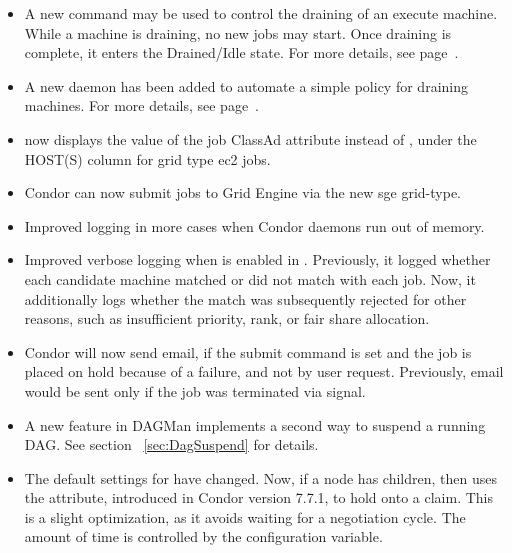 \begin{itemize}
\item A new command  may be used to control the draining
of an execute machine.  While a machine is draining, no new jobs may
start.  Once draining is complete, it enters the Drained/Idle state.
For more details, see page~\pageref{man-condor-drain}.

\item A new daemon  has been added to automate a simple
policy for draining machines.  For more details, see
page~\pageref{sec:Config-defrag}.

\item  {}  now displays the value of the job ClassAd
attribute  instead of
\Expr{[????????????????]},
under the HOST(S) column for grid type ec2 jobs.

\item Condor can now submit jobs to Grid Engine via the new sge grid-type.

\item Improved logging in more cases when Condor daemons run out of memory.

\item Improved verbose logging when  is enabled in
.  Previously, it logged whether each
candidate machine matched or did not match with each job.  Now, it
additionally logs whether the match was subsequently rejected for
other reasons, such as insufficient priority, rank, or fair share
allocation.

\item Condor will now send email,
if the submit command  is set and
the job is placed on hold because of a failure, and not by user request.
Previously, email would be sent only if the job was terminated via signal.

\item A new feature in DAGMan implements a second way to suspend a running DAG.
See section ~\ref{sec:DagSuspend} for details.

\item The default settings for  have changed.
Now, if a node has children, then  uses the
 attribute, 
introduced in Condor version 7.7.1, to hold onto a claim.
This is a slight optimization, 
as it avoids waiting for a negotiation cycle.
The amount of time is controlled by the
 configuration variable.


\end{itemize}
